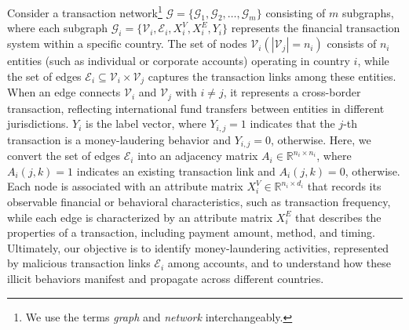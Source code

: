 Consider a transaction network\footnote{We use the terms \textit{graph} and \textit{network} interchangeably.} $\mathcal{G}=\{\mathcal{G}_1, \mathcal{G}_2, \ldots, \mathcal{G}_m\}$ consisting of $m$ subgraphs, where each subgraph $\mathcal{G}_i=\{\mathcal{V}_i, \mathcal{E}_i, X_i^V, X_i^E, Y_i\}$ represents the financial transaction system within a specific country. The set of nodes $\mathcal{V}_i (|\mathcal{V}_j|=n_i)$ consists of $n_i$ entities (such as individual or corporate accounts) operating in country $i$, while the set of edges $\mathcal{E}_i \subseteq \mathcal{V}_i \times \mathcal{V}_j $ captures the transaction links among these entities. When an edge connects $\mathcal{V}_i$ and $\mathcal{V}_j$ with $i \neq j$, it represents a cross-border transaction, reflecting international fund transfers between entities in different jurisdictions. $Y_i$ is the label vector, where $Y_{i,j}=1$ indicates that the $j$-th transaction is a money-laudering behavior and $Y_{i,j}=0$, otherwise. Here, we convert the set of edges $\mathcal{E}_i$ into an adjacency matrix $A_i\in \mathbb{R}^{n_i \times n_i}$, where $A_i(j,k)=1$ indicates an existing transaction link and  $A_i(j,k)=0$, otherwise. Each node is associated with an attribute matrix $X_i^V\in \mathbb{R}^{n_i \times d_i}$ that records its observable financial or behavioral characteristics, such as transaction frequency, while each edge is characterized by an attribute matrix $X_i^E$ that describes the properties of a transaction, including payment amount, method, and timing. Ultimately, our objective is to identify money-laundering activities, represented by malicious transaction links $\mathcal{E}_i$ among accounts, and to understand how these illicit behaviors manifest and propagate across different countries.


